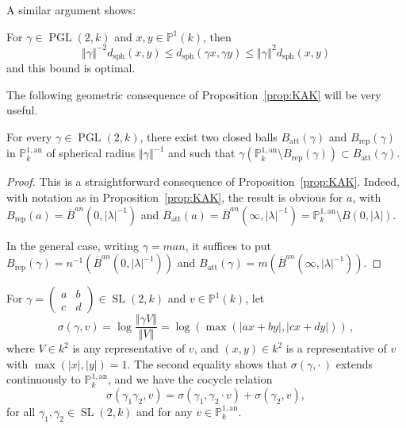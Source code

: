 \documentclass[AHL,Unicode,longabstracts]{cedram}
\DeclareMathOperator{\sph}{sph}
\DeclareMathOperator{\SL}{SL}
\DeclareMathOperator{\PGL}{PGL}
\newcommand{\pp}{\mathbb{P}}
\newcommand{\an}{\mathrm{an}}
\newcommand{\norm}[1]{\left\Vert#1\right\Vert}
\newcommand{\abs}[1]{\left\vert#1\right\vert}
\newcommand{\PP}{\mathbb{P}}
\newcommand{\berk}{{\mathbb{P}^{1, \mathrm{an}}_k}}
\newcommand{\lrpar}[1]{\left(#1\right)}
\newcommand{\la}{\lambda}
\newcommand{\att}{\mathrm{att}}
\newcommand{\rep}{\mathrm{rep}}
\newcommand{\SLk}{\SL(2,k)}
\newcommand{\PGLk}{\PGL(2, k)}
\newcommand{\inv}{^{-1}}
\begin{document}
A similar argument shows:

\begin{lemm}\label{lem:lipschitz}
For $\gamma\in \PGLk$ and $x, y\in \PP^1(k)$, then
\[
\norm{\gamma}^{-2} d_{\sph}(x, y)\leq d_{\sph}(\gamma x, \gamma y)\leq
\norm{\gamma}^{2} d_\mathrm{sph}(x, y)
\]
and this bound is optimal.
\end{lemm}

The following geometric consequence of Proposition~\ref{prop:KAK} will be very useful.

\begin{prop}\label{prop:B att rep}
For every $\gamma\in \PGLk$, there exist two closed balls $B_\att(\gamma)$ and $B_\rep(\gamma)$ in $\PP^{1,\an}_k$ of spherical radius $\norm{\gamma}\inv$ and such that $\gamma(\PP^{1,\an}_k\setminus B_\rep(\gamma))\subset B_\att(\gamma)$.
\end{prop}

\begin{proof}
This is a straightforward consequence of Proposition~\ref{prop:KAK}. Indeed, with notation as in Proposition~\ref{prop:KAK}, the result is obvious for $a$, with $B_\rep(a) = \overline{B}^{an}(0, \abs{\la}\inv)$ and $B_\att(a) = \overline{B}^{an}(\infty, \abs{\la}\inv) = \pp^{1,\an}_k\setminus B(0, \abs{\la})$.

In the general case, writing $\gamma =man$, it suffices to put $B_{\rep}(\gamma) = n\inv (\overline{B}^{an}(0, \abs{\lambda}\inv))$ and $B_{\att}(\gamma) = m (\overline{B}^{an}(\infty, \abs{\lambda}\inv))$.
\end{proof}

For $\gamma = \lrpar{
\begin{smallmatrix} a & b \\ c & d
\end{smallmatrix}} \in \SLk$ and $v\in \pp^1(k)$, let
\begin{equation}\label{eq:sigma1}
\sigma(\gamma,v) = \log\frac{\norm{\gamma V}}{\norm{V}} =\log \lrpar{\max (\abs{ax+by}, \abs{cx+dy}) }\,,
\end{equation}
where $V\in k^2$ is any representative of $v$, and $(x,y)\in k^2$ is a representative of $v$ with $\max (\abs{x}, \abs{y})=1$. The second equality shows that $\sigma(\gamma,{\cdot\,})$ extends continuously to $\berk$, and we have the cocycle relation
\begin{equation}\label{eq:cocycle}
\sigma(\gamma_1 \gamma_2,v) = \sigma(\gamma_1, \gamma_2 \cdot v) + \sigma(\gamma_2, v),
\end{equation}
for all $\gamma_1, \gamma_2 \in \SL(2,k)$ and for any $v\in \PP^{1,\an}_k$.
\end{document}
